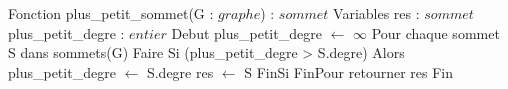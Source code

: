 \begin{algorithm}[caption={Plus petit sommet}] \label{alg:pps}
    Fonction plus_petit_sommet(G : $graphe$) : $sommet$
    Variables
        res : $sommet$
        plus_petit_degre : $entier$
    Debut
        plus_petit_degre $\gets$ $\infty$
        Pour chaque sommet S dans sommets(G) Faire
            Si (plus_petit_degre > S.degre) Alors
                plus_petit_degre $\gets$ S.degre
                res $\gets$ S
            FinSi
        FinPour
        retourner res
    Fin
\end{algorithm}